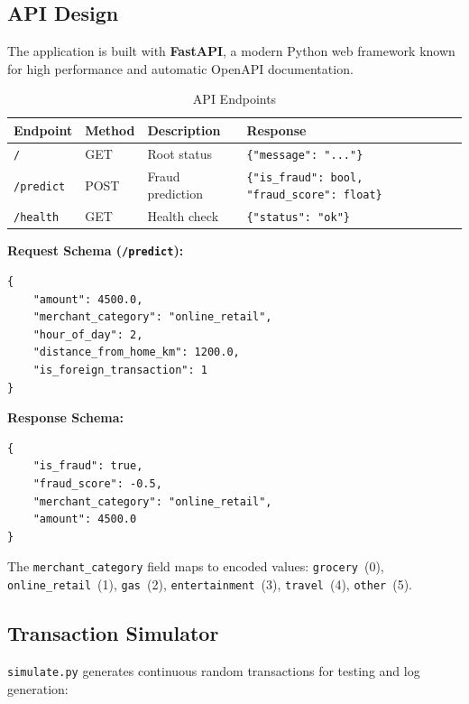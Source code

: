 \documentclass[12pt,a4paper]{article}
\begin{document}
\subsection{API Design}

The application is built with \textbf{FastAPI}, a modern Python web framework known for high performance and automatic OpenAPI documentation.

\begin{table}[H]
\centering
\caption{API Endpoints}
\begin{tabular}{@{}llll@{}}
\toprule
\textbf{Endpoint} & \textbf{Method} & \textbf{Description} & \textbf{Response} \\
\midrule
\texttt{/} & GET & Root status & \texttt{\{"message": "..."\}} \\
\texttt{/predict} & POST & Fraud prediction & \texttt{\{"is\_fraud": bool, "fraud\_score": float\}} \\
\texttt{/health} & GET & Health check & \texttt{\{"status": "ok"\}} \\
\bottomrule
\end{tabular}
\end{table}

\textbf{Request Schema (\texttt{/predict}):}

\begin{lstlisting}[language={}]
{
    "amount": 4500.0,
    "merchant_category": "online_retail",
    "hour_of_day": 2,
    "distance_from_home_km": 1200.0,
    "is_foreign_transaction": 1
}
\end{lstlisting}

\textbf{Response Schema:}

\begin{lstlisting}[language={}]
{
    "is_fraud": true,
    "fraud_score": -0.5,
    "merchant_category": "online_retail",
    "amount": 4500.0
}
\end{lstlisting}

The \texttt{merchant\_category} field maps to encoded values: \texttt{grocery}~(0), \texttt{online\_retail}~(1), \texttt{gas}~(2), \texttt{entertainment}~(3), \texttt{travel}~(4), \texttt{other}~(5).

\subsection{Transaction Simulator}

\texttt{simulate.py} generates continuous random transactions for testing and log generation:
\end{document}
